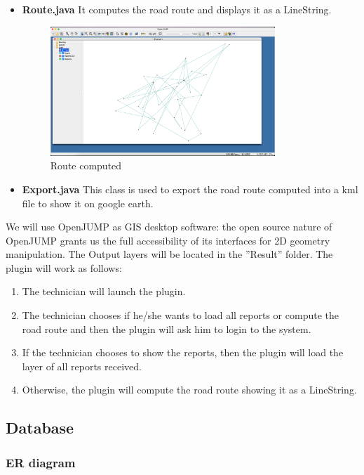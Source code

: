 \begin{itemize}
    \item\textbf{Route.java}
    It computes the road route and displays it as a LineString. 
    \begin{figure}[h]
        \centering
        \includegraphics[width=0.8\textwidth]{images/oj_route.png}
        \caption{Route computed}
        \label{ER}
 \end{figure}
    

    \item \textbf{Export.java}
    This class is used to export the road route computed into a kml file to show it on google earth.
\end{itemize}
We will use OpenJUMP as GIS desktop software: the open source nature of OpenJUMP grants us the full accessibility of its interfaces for 2D geometry manipulation. The Output layers will be located in the ”Result” folder. The plugin will work as follows:
\begin{enumerate}
    \item The technician will launch the plugin.
    \item The technician chooses if he/she wants to load all reports or compute the road route and then the plugin will ask him to login to the system.
    \item If the technician chooses to show the reports, then the plugin will load the layer of all reports received.
    \item Otherwise, the plugin will compute the road route showing it as a LineString.
\end{enumerate}

\newpage
 \subsection{Database}
 
 \subsubsection{ER diagram}

